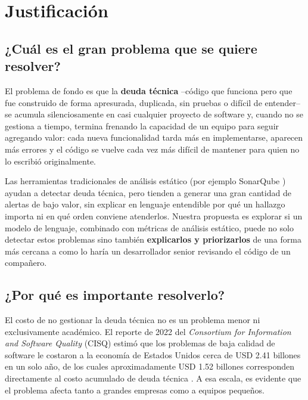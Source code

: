 \section{Justificación}
\label{sec:justificacion}

\subsection{¿Cuál es el gran problema que se quiere resolver?}

El problema de fondo es que la \textbf{deuda técnica} --código que funciona pero que fue construido de forma apresurada, duplicada, sin pruebas o difícil de entender-- se acumula silenciosamente en casi cualquier proyecto de software y, cuando no se gestiona a tiempo, termina frenando la capacidad de un equipo para seguir agregando valor: cada nueva funcionalidad tarda más en implementarse, aparecen más errores y el código se vuelve cada vez más difícil de mantener para quien no lo escribió originalmente.

Las herramientas tradicionales de análisis estático (por ejemplo SonarQube \parencite{SonarQube}) ayudan a detectar deuda técnica, pero tienden a generar una gran cantidad de alertas de bajo valor, sin explicar en lenguaje entendible por qué un hallazgo importa ni en qué orden conviene atenderlos. Nuestra propuesta es explorar si un modelo de lenguaje, combinado con métricas de análisis estático, puede no solo detectar estos problemas sino también \textbf{explicarlos y priorizarlos} de una forma más cercana a como lo haría un desarrollador senior revisando el código de un compañero.

\subsection{¿Por qué es importante resolverlo?}

El costo de no gestionar la deuda técnica no es un problema menor ni exclusivamente académico. El reporte de 2022 del \textit{Consortium for Information and Software Quality} (CISQ) estimó que los problemas de baja calidad de software le costaron a la economía de Estados Unidos cerca de USD 2.41 billones en un solo año, de los cuales aproximadamente USD 1.52 billones corresponden directamente al costo acumulado de deuda técnica \parencite{CISQ2022}. A esa escala, es evidente que el problema afecta tanto a grandes empresas como a equipos pequeños.

